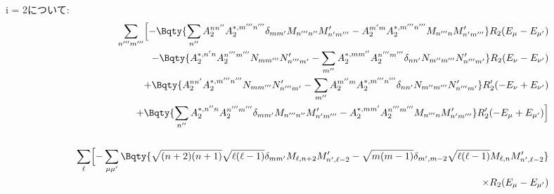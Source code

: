 \documentclass[10.5pt,a4paper]{jreport}
\begin{document}
i = 2について:
\begin{eqnarray}
  &&\sum_{n'''m'''}\Bigl[\nonumber -\Bqty{\sum_{n''}A_2^{nn''}A_2^{*, m'''n'''}\delta_{mm'}M_{n'''n''}M_{n'm'''}' - A_2^{m'm}A_2^{*, m'''n'''}M_{n'''n}M_{n'm'''}'}R_2(E_\mu - E_{\mu'})\\
    \nonumber &&- \Bqty{A_2^{*, n'n}A_2^{n'''m'''}N_{mm'''}N_{n'''m'}' - \sum_{m''}A_2^{*, mm''}A_2^{n'''m'''}\delta_{nn'}N_{m''m'''}N_{n'''m'}'}R_2(E_\nu - E_{\nu'})\\
    \nonumber &&+ \Bqty{A_2^{nn'}A_2^{*, m'''n'''}N_{mm'''}N_{n'''m'}' - \sum_{m''}A_2^{m''m}A_2^{*, m'''n'''}\delta_{nn'}N_{m''m'''}N_{n'''m'}'}R_2'(-E_\nu + E_{\nu'})\\
    \nonumber&&+\Bqty{\sum_{n''}A_2^{*, n''n}A_2^{n'''m'''}\delta_{mm'}M_{n'''n''}M_{n'm'''}' - A_2^{*, mm'}A_2^{n'''m'''}M_{n'''n}M_{n'm'''}'}R_2'(- E_\mu + E_{\mu'})\Bigr]\\
  \\
  &&\sum_{\ell }\Bigl[\nonumber -\sum_{\mu\mu'}\Bqty{\sqrt{(n+2)(n+1)}\sqrt{\ell (\ell -1)}\delta_{mm'}M_{\ell, n+2}M_{n', \ell -2}' - \sqrt{m(m-1)}\delta_{m', m-2}\sqrt{\ell (\ell -1)}M_{\ell, n}M_{n', \ell -2}'}\\
    \nonumber&&\hspace{14cm}\times R_2(E_\mu - E_{\mu'})\\

\end{eqnarray}
\end{document}
